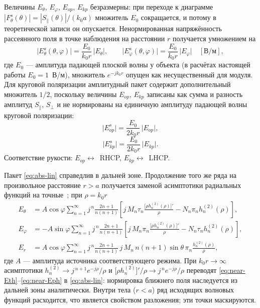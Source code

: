 \documentclass[11pt,a4paper]{article}
\newcommand{\hn}{h_n^{(2)}}
\begin{document}
Величины $E_\theta$, $E_\varphi$, $E_{op}$, $E_{kp}$ безразмерны: при переходе к
диаграмме $|F_\theta^s(\theta)| = |S_\parallel(\theta)|/(k_0a)$ множитель $E_0$
сокращается, и потому в теоретической записи он опускается. Ненормированная
напряжённость рассеянного поля в точке наблюдения на расстоянии $r$ получается
умножением на
%
\begin{equation}
  \label{eq:abs-lin}
  \boxed{\;
  \bigl|E_\theta^s(\theta,\varphi)\bigr| = \frac{E_0}{k_0r}\,\bigl|E_\theta\bigr|,
  \qquad
  \bigl|E_\varphi^s(\theta,\varphi)\bigr| = \frac{E_0}{k_0r}\,\bigl|E_\varphi\bigr|
  \quad [\text{В/м}],\;}
\end{equation}
%
где $E_0$ --- амплитуда падающей плоской волны у объекта (в расчётах настоящей
работы $E_0 = 1$~В/м), множитель $e^{-jk_0r}$ опущен как несущественный для модуля.
Для круговой поляризации амплитудный пакет содержит дополнительный множитель $1/2$,
поскольку величины $E_{op}$, $E_{kp}$ записаны как сумма и разность амплитуд
$S_\parallel$, $S_\perp$ и не нормированы на единичную амплитуду падающей волны
круговой поляризации:
%
\begin{equation}
  \label{eq:circR}
  \bigl|E_{op}^s\bigr| = \frac{E_0}{2k_0r}\,\bigl|E_{op}\bigr|,
\end{equation}
\begin{equation}
  \label{eq:circL}
  \bigl|E_{kp}^s\bigr| = \frac{E_0}{2k_0r}\,\bigl|E_{kp}\bigr| .
\end{equation}
%
Соответствие рукости: $E_{op}\leftrightarrow$~RHCP, $E_{kp}\leftrightarrow$~LHCP.

Пакет \eqref{eq:abs-lin} справедлив в дальней зоне. Продолжение того же ряда на
произвольное расстояние $r > a$ получается заменой асимптотики радиальных функций
на точные~\cite[ф-лы~4.45,~4.50]{bohren1983}; при $\rho = k_0r$
%
\begin{align}
  \label{eq:near-Eth}
  E_\theta &= A\cos\varphi\sum_{n=1}^{\infty}j^{\,n}\frac{2n+1}{n(n+1)}
    \left[j\,M_n\tau_n\frac{\bigl[\rho\hn(\rho)\bigr]'}{\rho} - N_n\pi_n\hn(\rho)\right],\\
  \label{eq:near-Eph}
  E_\varphi &= -A\sin\varphi\sum_{n=1}^{\infty}j^{\,n}\frac{2n+1}{n(n+1)}
    \left[j\,M_n\pi_n\frac{\bigl[\rho\hn(\rho)\bigr]'}{\rho} - N_n\tau_n\hn(\rho)\right],\\
  \label{eq:near-Er}
  E_r &= A\cos\varphi\sum_{n=1}^{\infty}j^{\,n}\frac{2n+1}{n(n+1)}\,
    j\,M_n\,n(n+1)\sin\theta\,\pi_n\frac{\hn(\rho)}{\rho},
\end{align}
%
где $A$ --- амплитуда источника соответствующего режима. При $k_0r\to\infty$
асимптотики $\hn\to j^{\,n+1}e^{-j\rho}/\rho$ и
$\bigl[\rho\hn\bigr]'/\rho\to j^{\,n}e^{-j\rho}/\rho$ переводят
\eqref{eq:near-Eth}--\eqref{eq:near-Eph} в \eqref{eq:abs-lin}: нормировка ближнего
поля наследуется из дальней зоны аналитически. Внутри тела ($r < a$) ряд исходящих
волновых функций расходится, что является свойством разложения; эти точки
маскируются.
\end{document}

